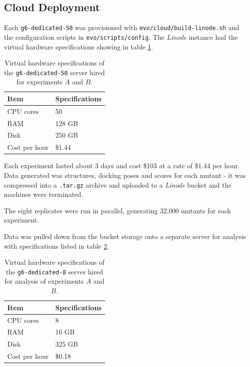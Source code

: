\documentclass[16pt]{book}
\begin{document}
\subsection{Cloud Deployment \label{cloud}}
Each \texttt{g6-dedicated-50} was provisioned with \texttt{evo/cloud/build-linode.sh} and the configuration scripts in \texttt{evo/scripts/config}.
The \textit{Linode} instance had the virtual hardware specifications showing in table \ref{linode}.

\begin{table}
        \begin{center}
		\caption{\label{linode} Virtual hardware specifications of the \texttt{g6-dedicated-50} server hired for experiments $A$ and $B$.}
                \begin{tabular}{l|p{3cm}}
		\textbf{Item} & \textbf{Specifications} \\
                \hline
			CPU cores & 50 \\
			RAM & 128 GB \\
			Disk & 250 GB \\
			Cost per hour & \$1.44 \\
        \end{tabular}
        \end{center}
\end{table}

Each experiment lasted about 3 days and cost \$103 at a rate of \$1.44 per hour. 
Data generated was structures, docking poses and scores for each mutant - it was compressed into a \texttt{.tar.gz} archive and uploaded to a \textit{Linode} bucket and the machines were terminated.

The eight replicates were run in parallel, generating 32,000 mutants for each experiment.

Data was pulled down from the bucket storage onto a separate server for analysis with specifications listed in table \ref{analysis}.
\begin{table}
        \begin{center}
		\caption{\label{analysis} Virtual hardware specifications of the \texttt{g6-dedicated-8} server hired for analysis of experiments $A$ and $B$.}
                \begin{tabular}{l|p{3cm}}
		\textbf{Item} & \textbf{Specifications} \\
                \hline
			CPU cores & 8 \\
			RAM & 16 GB \\
			Disk & 325 GB \\
			Cost per hour & \$0.18 \\
        \end{tabular}
        \end{center}
\end{table}
\end{document}
